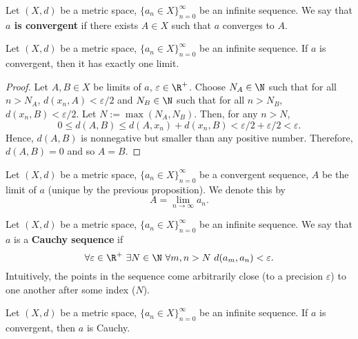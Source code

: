 \begin{definition}
  Let
    $(X, d)$ be a metric space,
    $\{a_n \in X\}_{n = 0}^\infty$ be an infinite sequence.
  We say that \textbf{$a$ is convergent} if
  there exists $A \in X$ such that $a$ converges to $A$.
\end{definition}
\begin{proposition}
  Let
    $(X, d)$ be a metric space,
    $\{a_n \in X\}_{n = 0}^\infty$ be an infinite sequence.
  If $a$ is convergent, then it has exactly one limit.
\end{proposition}
\begin{proof}
  Let $A, B \in X$ be limits of $a$, $\varepsilon \in \R^+$.
  Choose $N_A \in \N$ such that for all $n > N_A$, $d(x_n, A) < \varepsilon / 2$
  and $N_B \in \N$ such that for all $n > N_B$, $d(x_n, B) < \varepsilon / 2$.
  Let $N := \max(N_A, N_B)$.
  Then, for any $n > N$,
  \begin{equation}
    0
    \leq d(A, B)
    \leq d(A, x_n) + d(x_n, B)
    < \varepsilon / 2 + \varepsilon / 2
    < \varepsilon.
  \end{equation}
  Hence, $d(A, B)$ is nonnegative but smaller than any positive number.
  Therefore, $d(A, B) = 0$ and so $A = B$.
\end{proof}
\begin{notation}
  Let
    $(X, d)$ be a metric space,
    $\{a_n \in X\}_{n = 0}^\infty$ be a convergent sequence,
    $A$ be the limit of $a$ (unique by the previous proposition).
  We denote this by
  \begin{equation}
    A = \lim_{n \to \infty} a_n.
  \end{equation}
\end{notation}
\begin{definition}
  Let
    $(X, d)$ be a metric space,
    $\{a_n \in X\}_{n = 0}^\infty$ be an infinite sequence.
  We say that $a$ is a \textbf{Cauchy sequence} if
  \begin{equation}
    \forall \varepsilon \in \R^+\
      \exists N \in \N\
        \forall m, n > N\
          d(a_m, a_n) < \varepsilon.
  \end{equation}
  Intuitively, the points in the sequence come arbitrarily close
  (to a precision $\varepsilon$) to one another after some index ($N$).
\end{definition}
\begin{proposition}
  Let
    $(X, d)$ be a metric space,
    $\{a_n \in X\}_{n = 0}^\infty$ be an infinite sequence.
  If $a$ is convergent, then $a$ is Cauchy.
\end{proposition}
